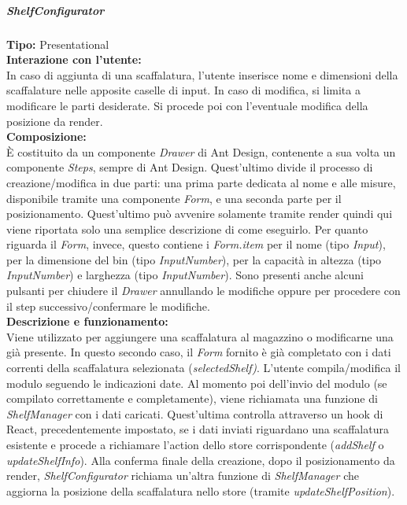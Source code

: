 \subparagraph{\colorbox{verde_uml}{ShelfConfigurator}}
\textbf{Tipo:} Presentational \\
\textbf{Interazione con l'utente:} \\
In caso di aggiunta di una scaffalatura, l'utente inserisce nome e dimensioni della scaffalature nelle apposite caselle di input. In caso di modifica, si limita a modificare le parti desiderate. Si procede poi con l'eventuale modifica della posizione da render.\\
\textbf{Composizione:} \\
È costituito da un componente \textit{Drawer} di Ant Design, contenente a sua volta un componente \textit{Steps}, sempre di Ant Design. Quest'ultimo divide il processo di creazione/modifica in due parti: una prima parte dedicata al nome e alle misure, disponibile tramite una componente \textit{Form}, e una seconda parte per il posizionamento. Quest'ultimo può avvenire solamente tramite render quindi qui viene riportata solo una semplice descrizione di come eseguirlo. Per quanto riguarda il \textit{Form}, invece, questo contiene i \textit{Form.item} per il nome (tipo \textit{Input}), per la dimensione del bin (tipo \textit{InputNumber}), per la capacità in altezza (tipo \textit{InputNumber}) e larghezza (tipo \textit{InputNumber}). Sono presenti anche alcuni pulsanti per chiudere il \textit{Drawer} annullando le modifiche oppure per procedere con il step successivo/confermare le modifiche.\\
\textbf{Descrizione e funzionamento:} \\
Viene utilizzato per aggiungere una scaffalatura al magazzino o modificarne una già presente. In questo secondo caso, il \textit{Form} fornito è già completato con i dati correnti della scaffalatura selezionata (\textit{selectedShelf)}. L'utente compila/modifica il modulo seguendo le indicazioni date. Al momento poi dell'invio del modulo (se compilato correttamente e completamente), viene richiamata una funzione di \textit{ShelfManager} con i dati caricati. Quest'ultima controlla attraverso un hook di React, precedentemente impostato, se i dati inviati riguardano una scaffalatura esistente e procede a richiamare l'action dello store corrispondente (\textit{addShelf} o \textit{updateShelfInfo}). Alla conferma finale della creazione, dopo il posizionamento da render, \textit{ShelfConfigurator} richiama un'altra funzione di \textit{ShelfManager} che aggiorna la posizione della scaffalatura nello store (tramite \textit{updateShelfPosition}).

